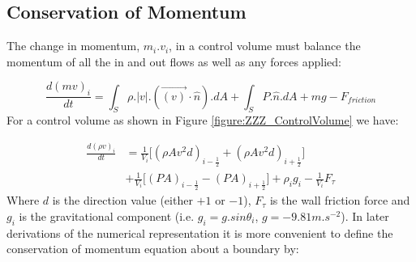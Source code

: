 \documentclass[11pt,letterpaper,titlepage]{article}
\newcommand{\half}{\frac{1}{2}}
\begin{document}
\subsection{Conservation of Momentum}
The change in momentum, $m_i.v_{i}$, in a control volume must balance the momentum of all the in and out flows as well as any forces applied:

\begin{equation*}
\frac{d(mv)_i}{dt}=\int_S \rho. |v|. (\vec{(v)}\cdot \hat{n}).dA + \int_S P.\hat{n}.dA+mg-F_{friction}
\end{equation*}
\newline
\noindent For a control volume as shown in Figure \ref{figure:ZZZ_ControlVolume} we have:

\begin{equation*}
\begin{aligned}
\frac{d(\rho v)_i}{dt}&=\frac{1}{V_i} \biggr[ (\rho A v^2 d)_{i-\half} +(\rho A v^2 d)_{i+\half}  \biggr] \\
&+\frac{1}{V_i} \biggr[ (PA)_{i-\half} - (PA)_{i+\half} \biggr]+\rho_ig_i-\frac{1}{V_i} F_{\tau}
\end{aligned}
\end{equation*}
\newline
Where $d$ is the direction value (either $+1$ or $-1$), $F_{\tau}$ is the wall friction force and $g_i$ is the gravitational component (i.e. $g_i=g.sin\theta_i$, $g=-9.81 m.s^{-2}$). In later derivations of the numerical representation it is more convenient to define the conservation of momentum equation about a boundary by:
\end{document}
